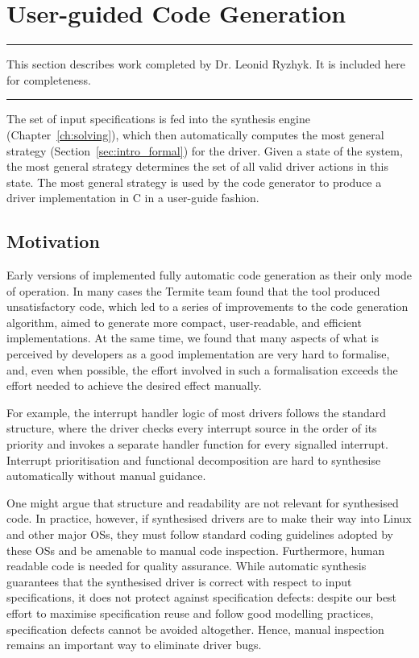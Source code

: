 \section{User-guided Code Generation}
\label{s:user-guided}

\hrule
\vspace{10pt}
\begin{center}
This section describes work completed by Dr. Leonid Ryzhyk. It is included here for completeness.
\end{center}
\hrule
\vspace{20pt}

The set of input \tsl specifications is fed into the \termite synthesis engine (Chapter~\ref{ch:solving}), which then automatically computes the most general strategy (Section~\ref{sec:intro_formal}) for the driver.  Given a state of the system, the most general strategy determines the set of all valid driver actions in this state.  The most general strategy is used by the \termite code generator to produce a driver implementation in C in a user-guide fashion.

\subsection{Motivation}

Early versions of \termite implemented fully automatic code generation as their only mode of operation.  In many cases the Termite team found that the tool produced unsatisfactory code, which led to a series of improvements to the code generation algorithm, aimed to generate more compact, user-readable, and efficient implementations.  At the same time, we found that many aspects of what is perceived by developers as a good implementation are very hard to formalise, and, even when possible, the effort involved in such a formalisation exceeds the effort needed to achieve the desired effect manually.

For example, the interrupt handler logic of most drivers follows the standard structure, where the driver checks every interrupt source in the order of its priority and invokes a separate handler function for every signalled interrupt.  Interrupt prioritisation and functional decomposition are hard to synthesise automatically without manual guidance.

One might argue that structure and readability are not relevant for synthesised code.  In practice, however, if synthesised drivers are to make their way into Linux and other major OSs, they must follow standard coding guidelines adopted by these OSs and be amenable to manual code inspection.  Furthermore, human readable code is needed for quality assurance.  While automatic synthesis guarantees that the synthesised driver is correct with respect to input specifications, it does not protect against specification defects: despite our best effort to maximise specification reuse and follow good modelling practices, specification defects cannot be avoided altogether.  Hence, manual inspection remains an important way to eliminate driver bugs.

